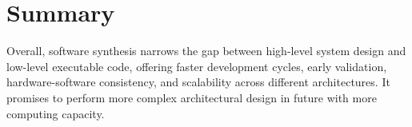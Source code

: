 \section{Summary}
Overall, software synthesis narrows the gap between high-level system design and low-level executable code, offering faster development cycles, early validation, hardware-software consistency, and scalability across different architectures. It promises to perform more complex architectural design in future with more computing capacity.

